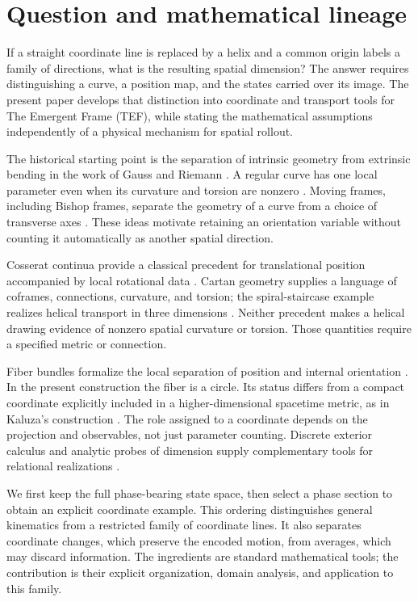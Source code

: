 \documentclass[11pt]{article}
\begin{document}
\section{Question and mathematical lineage}

If a straight coordinate line is replaced by a helix and a common origin labels a family of directions, what is the resulting spatial dimension? The answer requires distinguishing a curve, a position map, and the states carried over its image. The present paper develops that distinction into coordinate and transport tools for The Emergent Frame (TEF), while stating the mathematical assumptions independently of a physical mechanism for spatial rollout.

The historical starting point is the separation of intrinsic geometry from extrinsic bending in the work of Gauss and Riemann \cite{Gauss,Riemann}. A regular curve has one local parameter even when its curvature and torsion are nonzero \cite{doCarmo}. Moving frames, including Bishop frames, separate the geometry of a curve from a choice of transverse axes \cite{Bishop,Hornung}. These ideas motivate retaining an orientation variable without counting it automatically as another spatial direction.

Cosserat continua provide a classical precedent for translational position accompanied by local rotational data \cite{Cosserat}. Cartan geometry supplies a language of coframes, connections, curvature, and torsion; the spiral-staircase example realizes helical transport in three dimensions \cite{LazarHehl}. Neither precedent makes a helical drawing evidence of nonzero spatial curvature or torsion. Those quantities require a specified metric or connection.

Fiber bundles formalize the local separation of position and internal orientation \cite{Steenrod}. In the present construction the fiber is a circle. Its status differs from a compact coordinate explicitly included in a higher-dimensional spacetime metric, as in Kaluza's construction \cite{Kaluza}. The role assigned to a coordinate depends on the projection and observables, not just parameter counting. Discrete exterior calculus and analytic probes of dimension supply complementary tools for relational realizations \cite{Desbrun,Carlip}.

We first keep the full phase-bearing state space, then select a phase section to obtain an explicit coordinate example. This ordering distinguishes general kinematics from a restricted family of coordinate lines. It also separates coordinate changes, which preserve the encoded motion, from averages, which may discard information. The ingredients are standard mathematical tools; the contribution is their explicit organization, domain analysis, and application to this family.
\end{document}
